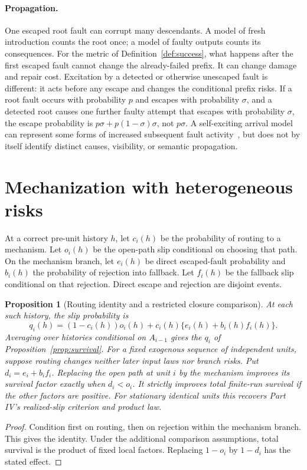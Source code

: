 \documentclass[11pt]{article}
\newtheorem{proposition}[theorem]{Proposition}
\theoremstyle{definition}
\theoremstyle{remark}
\begin{document}
\paragraph{Propagation.}
One escaped root fault can corrupt many descendants. A model of fresh introduction counts
the root once; a model of faulty outputs counts its consequences. For the metric of
Definition~\ref{def:success}, what happens after the first escaped fault cannot change the
already-failed prefix. It can change damage and repair cost. Excitation by a detected or
otherwise unescaped fault is different: it acts before any escape and changes the conditional
prefix risks. If a root fault occurs with probability $p$ and escapes with probability $\sigma$,
and a detected root causes one further faulty attempt that escapes with probability $\sigma$,
the escape probability is $p\sigma+p(1-\sigma)\sigma$, not $p\sigma$. A self-exciting arrival model can
represent some forms of increased subsequent fault activity~\cite{hawkes}, but does not by
itself identify distinct causes, visibility, or semantic propagation.

\section{Mechanization with heterogeneous risks}\label{sec:psm}
At a correct pre-unit history $h$, let $c_i(h)$ be the probability of routing to a mechanism.
Let $o_i(h)$ be the open-path slip conditional on choosing that path.
On the mechanism branch, let $e_i(h)$ be direct escaped-fault probability and $b_i(h)$ the
probability of rejection into fallback. Let $f_i(h)$ be the fallback slip conditional on
that rejection. Direct escape and rejection are disjoint events.

\begin{proposition}[Routing identity and a restricted closure comparison]\label{prop:closure}
At each such history, the slip probability is
\begin{equation}\label{eq:closure}
q_i(h)=(1-c_i(h))o_i(h)+c_i(h)\{e_i(h)+b_i(h)f_i(h)\}.
\end{equation}
Averaging over histories conditional on $A_{i-1}$ gives the $q_i$ of
Proposition~\ref{prop:survival}.
For a fixed exogenous sequence of independent units, suppose routing changes neither later
input laws nor branch risks. Put $d_i=e_i+b_if_i$. Replacing the open path at unit $i$ by the
mechanism improves its survival factor exactly when $d_i<o_i$.
It strictly improves total finite-run survival if the other factors are positive.
For stationary identical units this recovers Part IV's realized-slip criterion and product law.
\end{proposition}
\begin{proof}
Condition first on routing, then on rejection within the mechanism branch. This gives the
identity. Under the additional comparison assumptions, total survival is the product of
fixed local factors. Replacing $1-o_i$ by $1-d_i$ has the stated effect.
\end{proof}
\end{document}

